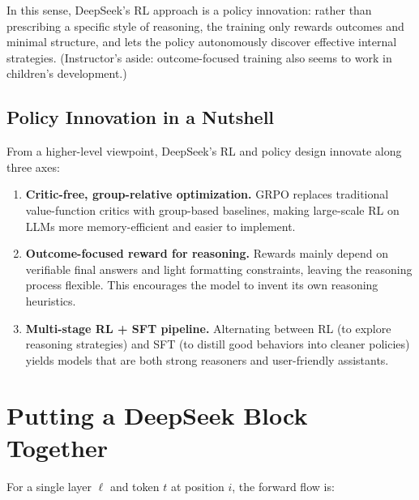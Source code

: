 \documentclass[11pt]{article}
\theoremstyle{remark}
\newcommand{\highlight}[1]{\colorbox{yellow!40}{#1}}
\begin{document}
In this sense, DeepSeek's RL approach is a \highlight{policy innovation}: rather than prescribing a specific style of reasoning, the training only rewards \highlight{outcomes and minimal structure}, and lets the policy autonomously discover effective internal strategies. (Instructor's aside: outcome-focused training also seems to work in children's development.)

\subsection{Policy Innovation in a Nutshell}

From a higher-level viewpoint, DeepSeek's RL and policy design innovate along three axes:

\begin{enumerate}[label=\arabic*)]
  \item \textbf{Critic-free, group-relative optimization.} GRPO replaces traditional value-function critics with group-based baselines, making large-scale RL on LLMs more memory-efficient and easier to implement.
  \item \textbf{Outcome-focused reward for reasoning.} Rewards mainly depend on verifiable final answers and light formatting constraints, leaving the reasoning process flexible. This encourages the model to invent its own reasoning heuristics.
  \item \textbf{Multi-stage RL + SFT pipeline.} Alternating between RL (to explore reasoning strategies) and SFT (to distill good behaviors into cleaner policies) yields models that are both strong reasoners and user-friendly assistants.
\end{enumerate}

\section{Putting a DeepSeek Block Together}

For a single layer $\ell$ and token $t$ at position $i$, the forward flow is:
\end{document}
